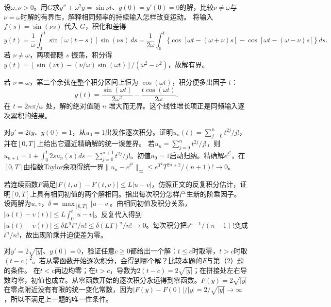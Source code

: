 设\(\omega,\nu>0\)。用\(G\)求\(y''+\omega^2y=\sin\nu t\)、\(y(0)=y'(0)=0\)的解，比较\(\nu\ne\omega\)与\(\nu=\omega\)时解的有界性，解释相同频率的持续输入怎样改变运动。
\solutionanswer
将输入 \(f(s)=\sin(\nu s)\) 代入 \(G\)，积化和差得
\[
 y(t)=\frac1\omega\int_0^t\sin[\omega(t-s)]\sin(\nu s)\,ds
 =\frac1{2\omega}\int_0^t
 \bigl\{\cos[\omega t-(\omega+\nu)s]-\cos[\omega t-(\omega-\nu)s]\bigr\}\,ds .
\]
若 \(\nu\ne\omega\)，两项都随 \(s\) 振荡，积分得
\(y(t)=[\sin(\nu t)-(\nu/\omega)\sin(\omega t)]/(\omega^2-\nu^2)\)，故解有界。

若 \(\nu=\omega\)，第二个余弦在整个积分区间上恒为 \(\cos(\omega t)\)，积分便多出因子 \(t\)：
\[
 y(t)=\frac{\sin(\omega t)}{2\omega^2}-\frac{t\cos(\omega t)}{2\omega}.
\]
在 \(t=2n\pi/\omega\) 处，解的绝对值随 \(n\) 增大而无界。这个线性增长项正是同频输入逐次累积的结果。


对\(y'=2ty\)、\(y(0)=1\)，从\(u_0=1\)出发作逐次积分。证明\(u_n(t)=\sum_{j=0}^nt^{2j}/j!\)，并在\([0,T]\)上给出它逼近精确解的统一误差界。
\solutionanswer
若\(u_n=\sum_{j=0}^nt^{2j}/j!\)，则\(u_{n+1}=1+\int_0^t2su_n(s)ds=\sum_{j=0}^{n+1}t^{2j}/j!\)。初值\(u_0=1\)启动归纳。精确解\(e^{t^2}\)，在\([0,T]\)由指数Taylor余项得统一界\(\|u_n-e^{t^2}\|_\infty\le e^{T^2}T^{2n+2}/(n+1)!\to0\)。


若连续函数\(F\)满足\(|F(t,u)-F(t,v)|\le L|u-v|\)，仿照正文的反复积分估计，证明\([0,T]\)上具有相同初值的两个解相同。指出每次积分怎样产生新的阶乘因子。
\solutionanswer
设两解为\(u,v\)，\(\delta=\max_{[0,T]}|u-v|\)。由相同初值及积分关系，\(|u(t)-v(t)|\le L\int_0^t|u-v|\)。反复代入得到\(|u(t)-v(t)|\le\delta L^nt^n/n!\le\delta(LT)^n/n!\to0\)。每次积分把\(s^{n-1}/(n-1)!\)变成\(t^n/n!\)，故出现阶乘并迫使差为零。


对\(y'=2\sqrt{|y|}\)、\(y(0)=0\)，验证任意\(c\ge0\)都给出一个解：\(t\le c\)时取零，\(t>c\)时取\((t-c)^2\)。若从零函数开始逐次积分，会得到哪个解？比较本题的\(F\)与第（2）题的条件。
\solutionanswer
在\(t<c\)两边均零；在\(t>c\)，导数为\(2(t-c)=2\sqrt{|y|}\)；在拼接处左右导数均零，初值也成立。从零函数开始的逐次积分永远得到零函数。\(F(y)=2\sqrt{|y|}\)在零点附近没有有限的统一变化常数，因为\(|F(y)-F(0)|/|y|=2/\sqrt{|y|}\to\infty\)，所以不满足上一题的唯一性条件。


